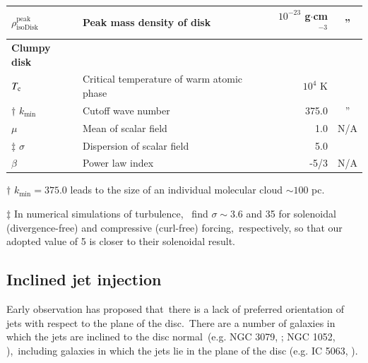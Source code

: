 \documentclass[twocolumn]{aastex631}
\begin{document}
\begin{table}[t]
\begin{tabular}{@{}llrc@{}}
$\rho_{\text{isoDisk}}^{\text{peak}}$ & Peak mass density of disk                 & $10^{-23}$ g$\cdot$cm$^{-3}$         & \multicolumn{1}{c}{''}         \\ \hline
{\bf Clumpy disk }                    &                                           &                                      &                                \\
$T_{\text{\text{c}}}$                 & Critical temperature of warm atomic phase & $10^{4}$ K                           & \citep{peak-ism-density}       \\
$\dagger$  $k_{\text{min}}$           & Cutoff wave number                        & 375.0                                & \multicolumn{1}{c}{''}         \\
$\mu$                                 & Mean of scalar field                      & 1.0                                  &   N/A                          \\
$\ddag$  $\sigma$                     & Dispersion of scalar field                & 5.0                                  & \citep{Federrath2010}          \\
$\beta$                               & Power law index                           & -5/3                                 &   N/A                          \\ \midrule
\end{tabular}
\begin{tablenotes}
      \raggedright
      \item  $\dagger$  $k_{\text{min}}=375.0$ leads to the size of an individual molecular cloud $\sim 100$ pc.
      \item  $\ddag$ In numerical simulations of turbulence,\
             \citet{Federrath2010} find $\sigma\sim 3.6$ and 35 for solenoidal (divergence-free) and compressive (curl-free) forcing,\
             respectively, so that our adopted value of 5 is closer to their solenoidal result.
    \end{tablenotes}
\end{table}


%

\subsection{Inclined jet injection}
  Early observation \citep{Gallimore2006} has proposed that\
  there is a lack of preferred orientation of jets with respect to the plane of the disc.\
  There are a number of galaxies in which the jets are inclined to the disc normal\
  (e.g. NGC 3079, \citealt{Cecil2001}; NGC 1052, \citealt{Dopita2015}),\
  including galaxies in which the jets lie in the plane of the disc (e.g. IC 5063, \citealt{Morganti2015}).
\end{document}
